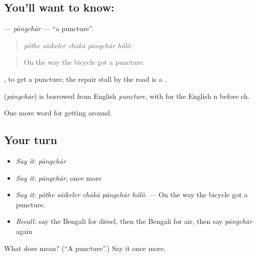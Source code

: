 \subsection*{You'll want to know: }
\textbf{} — \emph{pāngchār} — \textquotedblleft{}a puncture\textquotedblright{}.

\begin{quote}
    
\end{quote}

\begin{quote}
\emph{pôthe sāikeler chākā pāngchār hôlô.}
\end{quote}

\begin{quote}
On the way the bicycle got a puncture.
\end{quote}

 , to get a puncture; the repair stall by the road is a  .

\begin{cousinweb}
\textbf{} (\emph{pāngchār}) is borrowed from English \emph{puncture}, with  for the English n before ch.
\end{cousinweb}

\begin{grammarlens}[title={What you've built}]
One more word for getting around.
\end{grammarlens}

\subsection*{Your turn}
\begin{itemize}
\raggedright
  \item \emph{Say it:} \emph{pāngchār}
  \item \emph{Say it:} \emph{pāngchār}, once more
  \item \emph{Say it:} \emph{pôthe sāikeler chākā pāngchār hôlô.} — On the way the bicycle got a puncture.
  \item \emph{Recall:} say the Bengali for diesel, then the Bengali for air, then say \emph{pāngchār} again
\end{itemize}

\begin{tcolorbox}[breakable,colback=teal!4,colframe=teal!35!black,title={Before you move on}]
What does  mean? (\textquotedblleft{}A puncture\textquotedblright{}.) Say it once more.
\end{tcolorbox}
